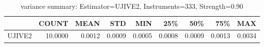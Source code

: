 \begin{table}[ht]
\centering
\caption{variance summary: Estimator=UJIVE2, Instruments=333, Strength=0.90}
\begin{tabular}{lrrrrrrrr}
\toprule
 & COUNT & MEAN & STD & MIN & 25\% & 50\% & 75\% & MAX \\
\midrule
UJIVE2 & 10.0000 & 0.0012 & 0.0009 & 0.0005 & 0.0008 & 0.0009 & 0.0013 & 0.0034 \\
\bottomrule
\end{tabular}
\end{table}
